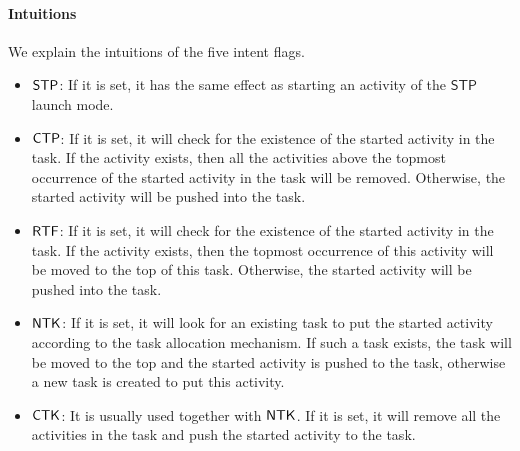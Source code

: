 \documentclass[preprint,12pt]{elsarticle}
\newcommand\Mm{{\mathcal{M} }}
\newcommand\act{{\sf Act}}
\newcommand\ntkflag{{\sf NTK}}
\newcommand\ctpflag{{\sf CTP}}
\newcommand\stpflag{{\sf STP}}
\newcommand\ctkflag{{\sf CTK}}
\newcommand\rtfflag{{\sf RTF}}
\newcommand{\LMAMASS}{\textsf{ASM}_\textsf{LM}}
\newcommand{\IFAMASS}{\textsf{ASM}_\textsf{IF}}
\newcommand{\STP}{\mathsf{STP}}
\begin{document}
\paragraph{Intuitions}  We explain the intuitions of the five intent flags. 
\begin{itemize}
	\item $\stpflag$:  If it is set,  it has the same effect as starting an activity of the $\STP$ launch mode.
	\item $\ctpflag$:  If it is set, it will check for the existence of the started activity in the task. If the activity exists, then all the activities above the topmost occurrence of the started activity in the task will be removed. Otherwise, the started activity will be pushed into the task.
	\item $\rtfflag$:  If it is set, it will check for the existence of the started activity in the task. If the activity exists, then the topmost occurrence of this activity will be moved to the top of this task. Otherwise, the started activity will be pushed into the task.
	\item $\ntkflag$:  If it is set, it will look for an existing task to put the started activity according to the task allocation mechanism. If such a task exists, the task will be moved to the top and the started activity is pushed to the task, otherwise a new task is created to put this activity.
	\item $\ctkflag$: It is usually used together with $\ntkflag$. If it is set, it will remove all the activities in the task and push the started activity to the task.
\end{itemize}

\end{document}
